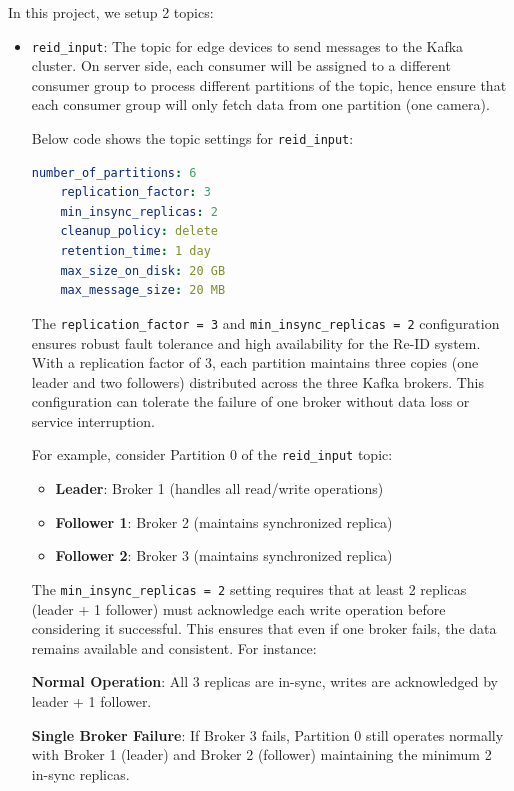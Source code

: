 In this project, we setup 2 topics:
\begin{itemize}
    \item \texttt{reid\_input}: The topic for edge devices to send messages to the Kafka cluster. On server side, each consumer will be assigned to a different consumer group to process different partitions of the topic, hence ensure that each consumer group will only fetch data from one  partition (one camera). 
    
    Below code shows the topic settings for \texttt{reid\_input}:
    
    \begin{lstlisting}[language=yaml]
    number_of_partitions: 6
    replication_factor: 3
    min_insync_replicas: 2
    cleanup_policy: delete
    retention_time: 1 day
    max_size_on_disk: 20 GB
    max_message_size: 20 MB
    \end{lstlisting}

    The \texttt{replication\_factor = 3} and \texttt{min\_insync\_replicas = 2} configuration ensures robust fault tolerance and high availability for the Re-ID system. With a replication factor of 3, each partition maintains three copies (one leader and two followers) distributed across the three Kafka brokers. This configuration can tolerate the failure of one broker without data loss or service interruption.
    
    For example, consider Partition 0 of the \texttt{reid\_input} topic:
    \begin{itemize}
        \item \textbf{Leader}: Broker 1 (handles all read/write operations)
        \item \textbf{Follower 1}: Broker 2 (maintains synchronized replica)
        \item \textbf{Follower 2}: Broker 3 (maintains synchronized replica)
    \end{itemize}
    
    The \texttt{min\_insync\_replicas = 2} setting requires that at least 2 replicas (leader + 1 follower) must acknowledge each write operation before considering it successful. This ensures that even if one broker fails, the data remains available and consistent. For instance:
    
    \textbf{Normal Operation}: All 3 replicas are in-sync, writes are acknowledged by leader + 1 follower.
    
    \textbf{Single Broker Failure}: If Broker 3 fails, Partition 0 still operates normally with Broker 1 (leader) and Broker 2 (follower) maintaining the minimum 2 in-sync replicas.
    

\end{itemize}
